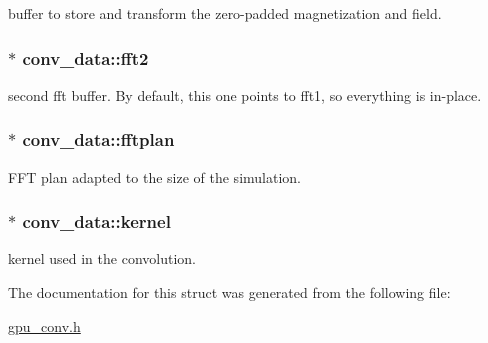 buffer to store and transform the zero-\/padded magnetization and field. 

\hypertarget{structconv__data_acfc7804271fbbdfaedba888f1b640b90}{
\subsubsection[{fft2}]{$\ast$ {\bf conv\_\-data::fft2}}}
\label{structconv__data_acfc7804271fbbdfaedba888f1b640b90}


second fft buffer. By default, this one points to fft1, so everything is in-\/place. 

\hypertarget{structconv__data_af91d107dc66437db0509684934b7a619}{
\subsubsection[{fftplan}]{$\ast$ {\bf conv\_\-data::fftplan}}}
\label{structconv__data_af91d107dc66437db0509684934b7a619}


FFT plan adapted to the size of the simulation. 

\hypertarget{structconv__data_acf63607af623a717c8068413ed98c47a}{
\subsubsection[{kernel}]{$\ast$ {\bf conv\_\-data::kernel}}}
\label{structconv__data_acf63607af623a717c8068413ed98c47a}


kernel used in the convolution. 



The documentation for this struct was generated from the following file:\begin{DoxyCompactItemize}
\item 
\hyperlink{gpu__conv_8h}{gpu\_\-conv.h}\end{DoxyCompactItemize}
